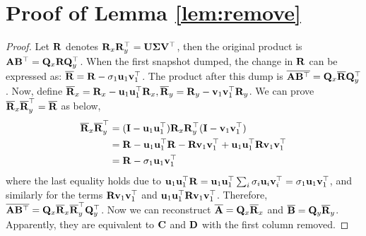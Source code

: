 \onecolumn
\section{Proof of Lemma \ref{lem:remove}} \label{apdx:remove}
\begin{proof}
    Let ${\bf R}$ denotes ${\bf R}_x{\bf R}_y^\top={\bf U}\mathbf{\Sigma}{\bf V}^\top$, then the original product is ${\bf A}{\bf B}^\top = {\bf Q}_x {\bf R} {\bf Q}_y^\top$. When the first snapshot dumped, the change in ${\bf R}$ can be expressed as: $\overline{{\bf R}} = {\bf R}-\sigma_1{\bf{u}}_1{\bf{v}}_1^\top$. The product after this dump is $\overline{{\bf A}{\bf B}^\top}={\bf Q}_x\overline{{\bf R}}{\bf Q}_y^\top$. Now, define $\overline{{\bf R}}_x = {\bf R}_x-{\bf{u}}_1{\bf{u}}_1^\top{\bf R}_x,\overline{{\bf R}}_y = {\bf R}_y-{\bf{v}}_1{\bf{v}}_1^\top{\bf R}_y$. We can prove $\overline{{\bf R}}_x\overline{{\bf R}}_y^\top=\overline{{\bf R}}$ as below,
   \begin{align*}
         \overline{{\bf R}}_x\overline{{\bf R}}_y^\top &= ({\bf I}-{\bf{u}}_1{\bf{u}}_1^\top){\bf R}_x{\bf R}_y^\top({\bf I}-{\bf{v}}_1{\bf{v}}_1^\top)  \\
         &= {\bf R}-{\bf{u}}_1{\bf{u}}_1^\top{\bf R}-{\bf R}{\bf{v}}_1{\bf{v}}_1^\top+{\bf{u}}_1{\bf{u}}_1^\top{\bf R}{\bf{v}}_1{\bf{v}}_1^\top   \\
         &= {\bf R}-\sigma_1{\bf{u}}_1{\bf{v}}_1^\top 
    \end{align*}
    where the last equality holds due to ${\bf{u}}_1 {\bf{u}}_1^\top {\bf R} = {\bf{u}}_1 {\bf{u}}_1^\top \sum_{i} \sigma_i {\bf{u}}_i {\bf{v}}_i^\top = \sigma_1 {\bf{u}}_1 {\bf{v}}_1^\top$, and similarly for the terms ${\bf R}{\bf{v}}_1{\bf{v}}_1^\top$ and ${\bf{u}}_1{\bf{u}}_1^\top{\bf R}{\bf{v}}_1{\bf{v}}_1^\top$. Therefore, $\overline{{\bf A}{\bf B}^\top}={\bf Q}_x\overline{{\bf R}}_x\overline{{\bf R}}_y^\top{\bf Q}_y^\top$. Now we can reconstruct $\overline{{\bf A}} = {\bf Q}_x\overline{{\bf R}}_x$ and $\overline{{\bf B}} = {\bf Q}_y\overline{{\bf R}}_y$. Apparently, they are equivalent to ${\bf C}$ and ${\bf D}$ with the first column removed. 
\end{proof}

